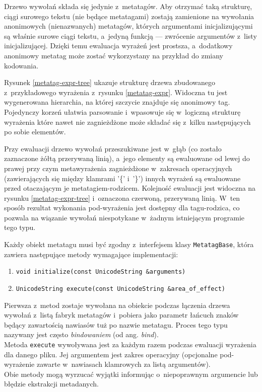 \par
Drzewo wywołań składa się jedynie z~metatagów. Aby otrzymać taką strukturę, ciągi surowego tekstu (nie będące metatagami) zostają zamienione na wywołania anonimowych (nienazwanych) metatagów, których argumentami inicjalizującymi są właśnie surowe ciągi tekstu, a~jedyną funkcją --- zwrócenie argumentów z~listy inicjalizującej. Dzięki temu ewaluacja wyrażeń jest prostsza, a~dodatkowy anonimowy metatag może zostać wykorzystany na przykład do zmiany kodowania.
\par
Rysunek \ref{metatag-expr-tree} ukazuje strukturę drzewa zbudowanego z~przykładowego wyrażenia z~rysunku \ref{metatag-expr}. Widoczna tu jest wygenerowana hierarchia, na której szczycie znajduje się anonimowy tag. Pojedynczy korzeń ułatwia parsowanie i~wpasowuje się w~logiczną strukturę wyrażenia które nawet nie zagnieżdżone może składać się z~kilku następujących po sobie elementów.
\par
Przy ewaluacji drzewo wywołań przeszukiwane jest w~głąb (co zostało zaznaczone żółtą przerywaną linią), a~jego elementy są ewaluowane od lewej do prawej przy czym metawyrażenia zagnieżdżone w~zakresach operacyjnych (zawierających się między klamrami '\{' i~'\}') innych wyrażeń są ewaluowane przed otaczającym je metatagiem-rodzicem. Kolejność ewaluacji jest widoczna na rysunku \ref{metatag-expr-tree} i~oznaczona czerwoną, przerywaną linią. W~ten sposób rezultat wykonania pod-wyrażenia jest dostępny dla tagu-rodzica, co pozwala na wiązanie wywołań niespotykane w~żadnym istniejącym programie tego typu.
\par
Każdy obiekt metatagu musi być zgodny z~interfejsem klasy \texttt{MetatagBase}, która zawiera następujące metody wymagające implementacji:
\begin{enumerate}
\item \texttt{void initialize(const UnicodeString \&arguments)}
\item \texttt{UnicodeString execute(const UnicodeString \&area\_of\_effect)}
\end{enumerate}

Pierwsza z~metod zostaje wywołana na obiekcie podczas łączenia drzewa wywołań z~listą fabryk metatagów i~pobiera jako parametr łańcuch znaków będący zawartością nawiasów tuż po nazwie metatagu. Proces tego typu nazywany jest często \textit{bindowaniem} (od ang. \textit{bind}).\\
Metoda \texttt{execute} wywoływana jest za każdym razem podczas ewaluacji wyrażenia dla danego pliku. Jej argumentem jest zakres operacyjny (opcjonalne pod-wyrażenie zawarte w~nawiasach klamrowych za listą argumentów).\\
Obie metody mogą wyrzucać wyjątki informując o~niepoprawnym argumencie lub błędzie ekstrakcji metadanych.

